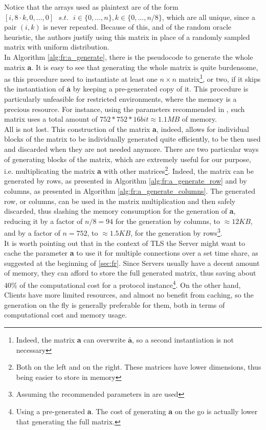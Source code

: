 Notice that the arrays used as plaintext are of the form $[i,8\cdot k,0,\dots,0]\text{ }s.t.\text{ }i\in\{0,\dots,n\},k\in\{0,\dots,n/8\}$, which are all unique, since a pair $(i,k)$ is never repeated. Because of this, and of the random oracle heuristic, the authors justify using this matrix in place of a randomly sampled matrix with uniform distribution.\\
In Algorithm \ref{alg:fr:a_generate}, there is the pseudocode to generate the whole matrix \textbf{a}. It is easy to see that generating the whole matrix is quite burdensome, as this procedure need to instantiate at least one $n\times n$ matrix\footnote{Indeed, the matrix \textbf{a} can overwrite $\bar{\textbf{a}}$, so a second instantiation is not necessary}, or two, if it skips the instantiation of $\bar{\textbf{a}}$ by keeping a pre-generated copy of it. This procedure is particularly unfeasible for restricted environments, where the memory is a precious resource. For instance, using the parameters recommended in \cite{frodo}, such matrix uses a total amount of $752*752*16bit\approx1.1MB$ of memory.\\
All is not lost. This construction of the matrix \textbf{a}, indeed, allows for individual blocks of the matrix to be individually generated quite efficiently, to be then used and discarded when they are not needed anymore. There are two particular ways of generating blocks of the matrix, which are extremely useful for our purpose, i.e. multiplicating the matrix \textbf{a} with other matrices\footnote{Both on the left and on the right. These matrices have lower dimensions, thus being easier to store in memory}. Indeed, the matrix can be generated by rows, as presented in Algorithm \ref{alg:fr:a_generate_row} and by columns, as presented in Algorithm \ref{alg:fr:a_generate_columns}. The generated row, or columns, can be used in the matrix multiplication and then safely discarded, thus slashing the memory consumption for the generation of \textbf{a}, reducing it by a factor of $n/8=94$ for the generation by columns, to $\approx 12KB$, and by a factor of $n=752$, to $\approx 1.5KB$, for the generation by rows\footnote{Assuming the recommended parameters in \cite{frodo} are used}.\\
It is worth pointing out that in the context of TLS the Server might want to cache the parameter \textbf{a} to use it for multiple connections over a set time share, as suggested at the beginning of \ref{sec:fr}. Since Servers usually have a decent amount of memory, they can afford to store the full generated matrix, thus saving about $40\%$ of the computational cost for a protocol instance\footnote{Using a pre-generated \textbf{a}. The cost of generating \textbf{a} on the go is actually lower that generating the full matrix.}. On the other hand, Clients have more limited resources, and almost no benefit from caching, so the generation on the fly is generally preferable for them, both in terms of computational cost and memory usage.

